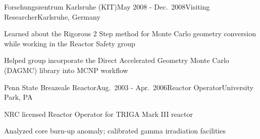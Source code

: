 


\begin{rSubsection}{Forschungszentrum Karlsruhe (KIT)}{May 2008 - Dec.\ 2008}{Visiting Researcher}{Karlsruhe, Germany}
\item Learned about the Rigorous 2 Step method for Monte Carlo geometry conversion while working in the Reactor Safety group
\item Helped group incorporate the Direct Accelerated Geometry Monte Carlo (DAGMC) library into MCNP workflow
\end{rSubsection}




\begin{rSubsection}{Penn State Breazeale Reactor}{Aug.\ 2003 - Apr.\ 2006}{Reactor Operator}{University Park, PA}
\item NRC licensed Reactor Operator for TRIGA Mark III reactor
\item Analyzed core burn-up anomaly; calibrated gamma irradiation facilities
\end{rSubsection}
